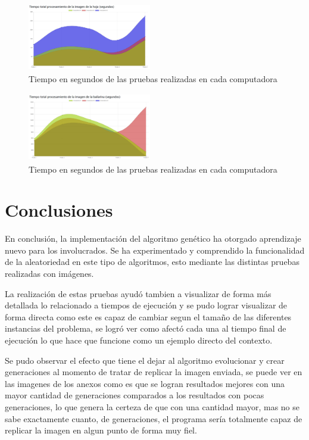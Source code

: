 \documentclass[conference]{IEEEtran}
\begin{document}
\begin{figure}[h]
    \centering
    \includegraphics[width=0.480\textwidth, height=3cm]{tablaHoja.png} 
    \caption{Tiempo en segundos de las pruebas realizadas en cada computadora}
    \label{fig:mi_imagen}
\end{figure}

\begin{figure}[h]
    \centering
    \includegraphics[width=0.480\textwidth, height=3cm]{tablaBailarina.png} 
    \caption{Tiempo en segundos de las pruebas realizadas en cada computadora}
    \label{fig:mi_imagen}
\end{figure}

\section{Conclusiones}
En conclusión, la implementación del algoritmo genético ha otorgado aprendizaje nuevo para los involucrados. Se ha experimentado y comprendido la funcionalidad de la aleatoriedad en este tipo de algoritmos, esto mediante las distintas pruebas realizadas con imágenes. 

La realización de estas pruebas ayudó tambien a visualizar de forma más detallada lo relacionado a tiempos de ejecución y se pudo lograr visualizar de forma directa como este es capaz de cambiar segun el tamaño de las diferentes instancias del problema, se logró ver como afectó cada una al tiempo final de ejecución lo que hace que funcione como un ejemplo directo del contexto.

Se pudo observar el efecto que tiene el dejar al algoritmo evolucionar y crear generaciones al momento de tratar de replicar la imagen enviada, se puede ver en las imagenes de los anexos como es que se logran resultados mejores con una mayor cantidad de generaciones comparados a los resultados con pocas generaciones, lo que genera la certeza de que con una cantidad mayor, mas no se sabe exactamente cuanto, de generaciones, el programa sería totalmente capaz de replicar la imagen en algun punto de forma muy fiel.
\end{document}
